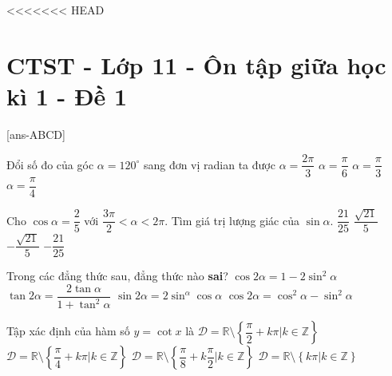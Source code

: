 <<<<<<< HEAD
\section{CTST - Lớp 11 - Ôn tập giữa học kì 1 - Đề 1}

\caulc

[ans-ABCD]

\begin{ex}%
Đổi số đo của góc $\alpha = 120^\circ$ sang đơn vị radian ta được
\choice
{\True $\alpha = \dfrac{2\pi}{3}$}
{$\alpha = \dfrac{\pi}{6}$}
{$\alpha = \dfrac{\pi}{3}$}
{$\alpha = \dfrac{\pi}{4}$}
\end{ex}

\begin{ex}%
Cho $\cos \alpha = \dfrac{2}{5}$ với $\dfrac{3\pi}{2} < \alpha < 2\pi$. Tìm giá trị lượng giác của $\sin \alpha$.
\choice
{$\dfrac{21}{25}$}
{$\dfrac{\sqrt{21}}{5}$}
{\True $-\dfrac{\sqrt{21}}{5}$}
{$-\dfrac{21}{25}$}
\end{ex}

\begin{ex}%
Trong các đẳng thức sau, đẳng thức nào \textbf{sai}?
\choice
{$\cos 2\alpha = 1 - 2 \sin^2 \alpha$}
{\True $\tan 2\alpha = \dfrac{2 \tan \alpha}{1+ \tan^2 \alpha}$}
{$\sin 2\alpha = 2 \sin^ \alpha \cos \alpha$}
{$\cos 2\alpha = \cos^2 \alpha - \sin^2 \alpha$}
\end{ex}

\begin{ex}%
Tập xác định của hàm số $y= \cot x$ là
\choice
{$\mathscr{D}= \mathbb{R} \setminus \left\{ \dfrac{\pi}{2} + k\pi | k \in \mathbb{Z} \right\}$}
{$\mathscr{D}= \mathbb{R} \setminus \left\{ \dfrac{\pi}{4} + k\pi | k \in \mathbb{Z} \right\}$}
{$\mathscr{D}= \mathbb{R} \setminus \left\{ \dfrac{\pi}{8} + k \dfrac{\pi}{2} | k \in \mathbb{Z} \right\}$}
{\True $\mathscr{D}= \mathbb{R} \setminus \left\{k\pi | k \in \mathbb{Z} \right\}$}
\end{ex}

